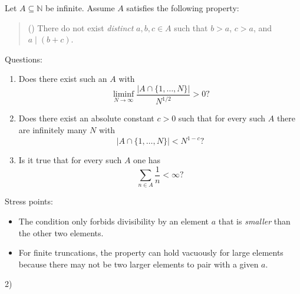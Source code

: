 Let $A\subseteq \mathbb{N}$ be infinite. Assume $A$ satisfies the following property:
\begin{quote}
(\*) There do not exist \emph{distinct} $a,b,c\in A$ such that $b>a$, $c>a$, and $a\mid (b+c)$.
\end{quote}
Questions:
\begin{enumerate}
\item[(Q1)] Does there exist such an $A$ with
\[\liminf_{N\to\infty} \frac{|A\cap\{1,\dots,N\}|}{N^{1/2}}>0?\]
\item[(Q2)] Does there exist an absolute constant $c>0$ such that for every such $A$ there are infinitely many $N$ with
\[|A\cap\{1,\dots,N\}|<N^{1-c}?\]
\item[(Q3)] Is it true that for every such $A$ one has
\[\sum_{n\in A}\frac{1}{n}<\infty?\]
\end{enumerate}

Stress points:
\begin{itemize}
\item The condition only forbids divisibility by an element $a$ that is \emph{smaller} than the other two elements.
\item For finite truncations, the property can hold vacuously for large elements because there may not be two larger elements to pair with a given $a$.
\end{itemize}

2)
